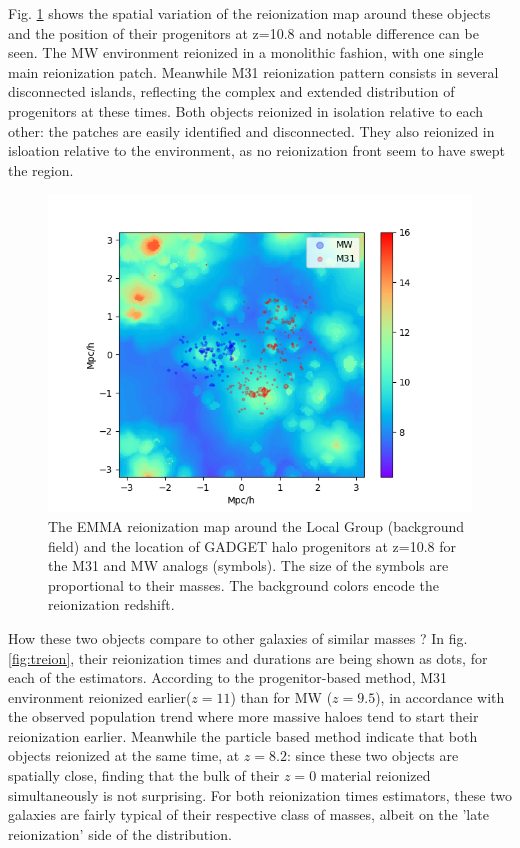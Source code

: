 \documentclass[twocolumn]{aastex61}
\begin{document}
Fig. \ref{fig:LG} shows the spatial variation of the reionization map around these objects and the position of their progenitors at z=10.8 and notable difference can be seen. The MW environment reionized in a monolithic fashion, with one single main reionization patch. Meanwhile M31 reionization pattern consists in several disconnected islands, reflecting the complex and extended distribution of progenitors at these times. Both objects reionized in isolation relative to each other: the patches are easily identified and disconnected. They also reionized in isloation relative to the environment, as no reionization front seem to have swept the region.

\begin{figure}[ht]
\includegraphics[width=1.3\columnwidth]{img/map_LG.png}
\caption{The EMMA reionization map around the Local Group (background field) and the location of GADGET halo progenitors at z=10.8 for the M31 and MW analogs (symbols). The size of the symbols are proportional to their masses. The background colors encode the reionization redshift.}
\label{fig:LG}
\end{figure}

How these two objects compare to other galaxies of similar masses ? In fig. \ref{fig:treion}, their reionization times and durations are being shown as dots, for each of the estimators. According to the progenitor-based method, M31 environment reionized earlier($z=11$) than for MW ($z=9.5$), in accordance with the observed population trend where more massive haloes tend to start their reionization earlier. Meanwhile the particle based method indicate that both objects reionized at the same time, at $z=8.2$: since these two objects are spatially close, finding that the bulk of their $z=0$ material  reionized simultaneously is not surprising. For both reionization times estimators, these two galaxies are fairly typical of their respective class of masses, albeit on the 'late reionization' side of the distribution. 
\end{document}
